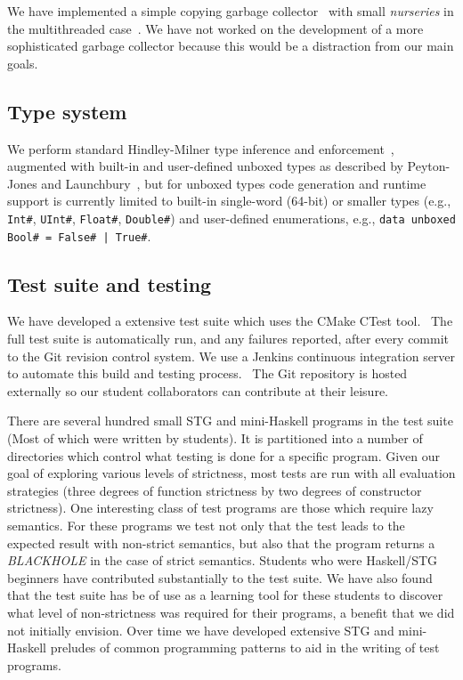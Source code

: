 \documentclass{llncs}
\begin{document}
We have implemented a simple copying garbage collector~\cite{Cheney:1970} with
small \emph{nurseries} in the multithreaded case~\cite{Marlow:2008}. We have
not worked on the development of a more sophisticated garbage collector
because this would be a distraction from our main goals.


\subsection{Type system}

We perform standard Hindley-Milner type inference and
enforcement~\cite{Heren02}, augmented with built-in and user-defined unboxed
types as described by Peyton-Jones and Launchbury~\cite{Jones91unboxedvalues},
but for unboxed types code generation and runtime support is currently limited
to built-in single-word (64-bit) or smaller types (e.g., \texttt{Int\#},
\texttt{UInt\#}, \texttt{Float\#}, \texttt{Double\#}) and user-defined
enumerations, e.g., \texttt{data unboxed Bool\# = False\# | True\#}.

\subsection{Test suite and testing}

We have developed a extensive test suite which uses the CMake CTest
tool.~\cite{cmake-book} The full test suite is automatically run, and any
failures reported, after every commit to the Git revision control system. We
use a Jenkins continuous integration server to automate this build and testing
process.~\cite{jenkins-book} The Git repository is hosted externally so our
student collaborators can contribute at their leisure.

There are several hundred small STG and mini-Haskell programs in the test suite 
(Most of which were written by students).
It is partitioned into a number of directories which control what
testing is done for a specific program. Given our goal of exploring various
levels of strictness, most tests are run with all evaluation strategies (three
degrees of function strictness by two degrees of constructor strictness).
One interesting class of test programs are those which require lazy
semantics. For these programs we test not only that the test leads to the expected
result with non-strict semantics, but also that the program returns a
\emph{BLACKHOLE} in the case of strict semantics. Students who were Haskell/STG
beginners have contributed substantially to the test suite. We have also found
that the test suite has be of use as a learning tool for these students to
discover what level of non-strictness was required for their programs,
a benefit that we did not initially envision. Over time we have developed
extensive STG and mini-Haskell preludes of common programming patterns to
aid in the writing of test programs.
\end{document}
